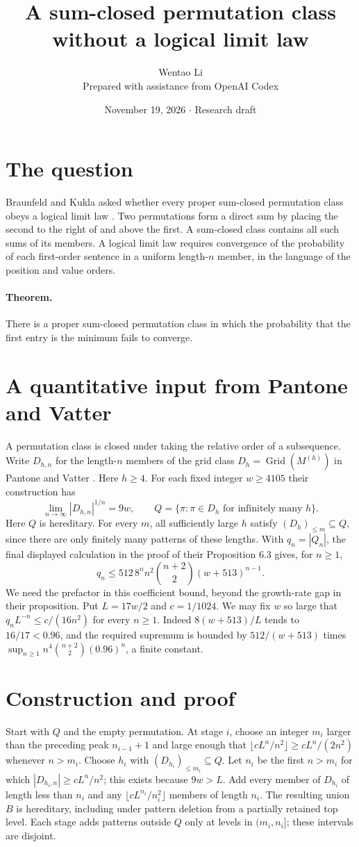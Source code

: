 \documentclass[11pt]{article}
\title{A sum-closed permutation class without a logical limit law}
\author{Wentao Li\\{\small Prepared with assistance from OpenAI Codex}}
\date{November 19, 2026 \quad $\cdot$ \quad Research draft}
\begin{document}
\maketitle
\section*{The question}
Braunfeld and Kukla asked whether every proper sum-closed permutation class obeys a logical limit law \cite{bk}. Two permutations form a direct sum by placing the second to the right of and above the first. A sum-closed class contains all such sums of its members. A logical limit law requires convergence of the probability of each first-order sentence in a uniform length-$n$ member, in the language of the position and value orders.

\paragraph{Theorem.} There is a proper sum-closed permutation class in which the probability that the first entry is the minimum fails to converge.
\section*{A quantitative input from Pantone and Vatter}
A permutation class is closed under taking the relative order of a subsequence. Write $D_{h,n}$ for the length-$n$ members of the grid class $D_h=\operatorname{Grid}(M^{(h)})$ in Pantone and Vatter \cite{pv}. Here $h\ge4$. For each fixed integer $w\ge4105$ their construction has
\[
 \lim_{n\to\infty}|D_{h,n}|^{1/n}=9w,\qquad
 Q=\{\pi:\pi\in D_h\text{ for infinitely many }h\}.
\]
Here $Q$ is hereditary. For every $m$, all sufficiently large $h$ satisfy $(D_h)_{\le m}\subseteq Q$, since there are only finitely many patterns of these lengths. With $q_n=|Q_n|$, the final displayed calculation in the proof of their Proposition 6.3 gives, for $n\ge1$,
\[
 q_n\le512\,8^n n^2 \binom{n+2}{2}(w+513)^{n-1}.
\]
We need the prefactor in this coefficient bound, beyond the growth-rate gap in their proposition. Put $L=17w/2$ and $c=1/1024$. We may fix $w$ so large that $q_nL^{-n}\le c/(16n^2)$ for every $n\ge1$. Indeed $8(w+513)/L$ tends to $16/17<0.96$, and the required supremum is bounded by $512/(w+513)$ times $\sup_{n\ge1} n^4\binom{n+2}{2}(0.96)^n$, a finite constant.

\section*{Construction and proof}
Start with $Q$ and the empty permutation. At stage $i$, choose an integer $m_i$ larger than the preceding peak $n_{i-1}+1$ and large enough that $\lfloor cL^n/n^2\rfloor\ge cL^n/(2n^2)$ whenever $n>m_i$. Choose $h_i$ with $(D_{h_i})_{\le m_i}\subseteq Q$. Let $n_i$ be the first $n>m_i$ for which $|D_{h_i,n}|\ge cL^n/n^2$; this exists because $9w>L$. Add every member of $D_{h_i}$ of length less than $n_i$ and any $\lfloor cL^{n_i}/n_i^2\rfloor$ members of length $n_i$. The resulting union $B$ is hereditary, including under pattern deletion from a partially retained top level. Each stage adds patterns outside $Q$ only at levels in $(m_i,n_i]$; these intervals are disjoint.
\end{document}
